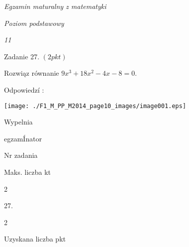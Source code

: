 \documentclass[a4paper,12pt]{article}
\begin{document}
{\it Egzamin maturalny z matematyki}

{\it Poziom podstawowy}

{\it 11}

Zadanie 27. $(2pkt)$

Rozwiąz równanie $9x^{3}+18x^{2}-4x-8=0.$

Odpowiedzí :
\begin{center}
\texttt{[image: ./F1\_M\_PP\_M2014\_page10\_images/image001.eps]}
\end{center}
Wypelnia

egzamÍnator

Nr zadania

Maks. liczba kt

2

27.

2

Uzyskana liczba pkt
\end{document}
